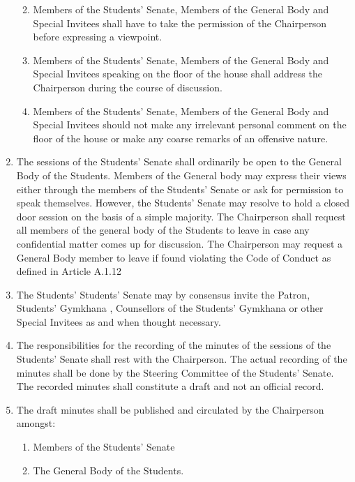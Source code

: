 \begin{enumerate}
  \begin{enumerate}
  \def\labelenumii{\alph{enumii}.}
  \item
    Members of the Students' Senate, Members of the General Body and
    Special Invitees shall have to take the permission of the
    Chairperson before expressing a viewpoint.
  \item
    Members of the Students' Senate, Members of the General Body and
    Special Invitees speaking on the floor of the house shall address
    the Chairperson during the course of discussion.
  \item
    Members of the Students' Senate, Members of the General Body and
    Special Invitees should not make any irrelevant personal comment on
    the floor of the house or make any coarse remarks of an offensive
    nature.
  \end{enumerate}
\item
  The sessions of the Students' Senate shall ordinarily be open to the
  General Body of the Students. Members of the General body may express
  their views either through the members of the Students' Senate or ask
  for permission to speak themselves. However, the Students' Senate may
  resolve to hold a closed door session on the basis of a simple
  majority. The Chairperson shall request all members of the general
  body of the Students to leave in case any confidential matter comes up
  for discussion. The Chairperson may request a General Body member to
  leave if found violating the Code of Conduct as defined in Article
  A.1.12
\item
  The Students' Students' Senate may by consensus invite the Patron,
  Students' Gymkhana , Counsellors of the Students' Gymkhana or other
  Special Invitees as and when thought necessary.
\item
  The responsibilities for the recording of the minutes of the sessions
  of the Students' Senate shall rest with the Chairperson. The actual
  recording of the minutes shall be done by the Steering Committee of
  the Students' Senate. The recorded minutes shall constitute a draft
  and not an official record.
\item
  The draft minutes shall be published and circulated by the Chairperson
  amongst:

  \begin{enumerate}
  \def\labelenumii{\alph{enumii}.}
  \item
    Members of the Students' Senate
  \item
    The General Body of the Students.
  \end{enumerate}


\end{enumerate}
